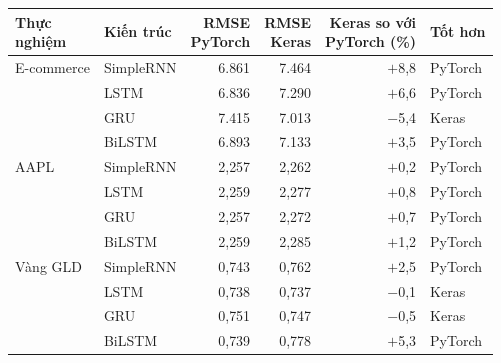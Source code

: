\begin{tabular}{llrrrl}
\toprule
\makecell[l]{Thực\\nghiệm} & Kiến trúc & \makecell[r]{RMSE\\PyTorch} & \makecell[r]{RMSE\\Keras} & \makecell[r]{Keras so với\\PyTorch (\%)} & Tốt hơn \\
\midrule
E-commerce & SimpleRNN & 6{.}861 & 7{.}464 & \ensuremath{+}8{,}8 & PyTorch \\
 & LSTM & 6{.}836 & 7{.}290 & \ensuremath{+}6{,}6 & PyTorch \\
 & GRU & 7{.}415 & 7{.}013 & \ensuremath{-}5{,}4 & Keras \\
 & BiLSTM & 6{.}893 & 7{.}133 & \ensuremath{+}3{,}5 & PyTorch \\
\midrule
AAPL & SimpleRNN & 2{,}257 & 2{,}262 & \ensuremath{+}0{,}2 & PyTorch \\
 & LSTM & 2{,}259 & 2{,}277 & \ensuremath{+}0{,}8 & PyTorch \\
 & GRU & 2{,}257 & 2{,}272 & \ensuremath{+}0{,}7 & PyTorch \\
 & BiLSTM & 2{,}259 & 2{,}285 & \ensuremath{+}1{,}2 & PyTorch \\
\midrule
Vàng GLD & SimpleRNN & 0{,}743 & 0{,}762 & \ensuremath{+}2{,}5 & PyTorch \\
 & LSTM & 0{,}738 & 0{,}737 & \ensuremath{-}0{,}1 & Keras \\
 & GRU & 0{,}751 & 0{,}747 & \ensuremath{-}0{,}5 & Keras \\
 & BiLSTM & 0{,}739 & 0{,}778 & \ensuremath{+}5{,}3 & PyTorch \\
\bottomrule
\end{tabular}
